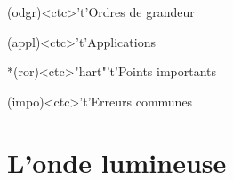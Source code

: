 \documentclass[../../main/main.tex]{subfiles}
\begin{document}
\begin{tcn}[sidebyside, fontupper=\small, fontlower=\small]
	\begin{tcn}(odgr)<ctc>'t'{Ordres de grandeur}
	\end{tcn}
	\begin{tcn}(appl)<ctc>'t'{Applications}
	\end{tcn}
	\begin{tcn}*(ror)<ctc>"hart"'t'{Points importants}
	\end{tcn}
	\begin{tcn}(impo)<ctc>'t'{Erreurs communes}
	\end{tcn}
\end{tcn}

\vspace*{\fill}

\newpage

\section{L'onde lumineuse}
\end{document}
